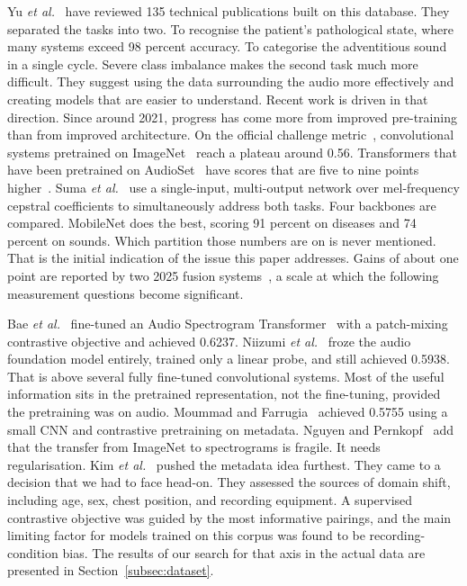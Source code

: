 \documentclass[journal,onecolumn]{IEEEtran}
\begin{document}
Yu \emph{et al.}~\cite{electronics2025review} have reviewed 135 technical publications
built on this database. They separated the tasks into two. To recognise the patient's
pathological state, where many systems exceed 98 percent accuracy. To categorise the
adventitious sound in a single cycle. Severe class imbalance makes the second task much
more difficult. They suggest using the data surrounding the audio more effectively and
creating models that are easier to understand. Recent work is driven in that direction.
Since around 2021, progress has come more from improved pre-training than from improved
architecture. On the official challenge metric~\cite{respirenet2021}, convolutional
systems pretrained on ImageNet~\cite{deng2009imagenet} reach a plateau around 0.56.
Transformers that have been pretrained on AudioSet~\cite{gemmeke2017audioset} have
scores that are five to nine points higher~\cite{bae2023patchmix,bts2024,pafa2025}. Suma
\emph{et al.}~\cite{suma2025mtl} use a single-input, multi-output network over
mel-frequency cepstral coefficients to simultaneously address both tasks. Four
backbones are compared. MobileNet does the best, scoring 91 percent on diseases and 74
percent on sounds. Which partition those numbers are on is never mentioned. That is the
initial indication of the issue this paper addresses. Gains of about one point are
reported by two 2025 fusion systems~\cite{adffnet2025,bspc2025fusion}, a scale at which
the following measurement questions become significant.

Bae \emph{et al.}~\cite{bae2023patchmix} fine-tuned an Audio Spectrogram
Transformer~\cite{gong2021ast} with a patch-mixing contrastive objective and achieved
0.6237. Niizumi \emph{et al.}~\cite{frozenfm2025} froze the audio foundation model
entirely, trained only a linear probe, and still achieved 0.5938. That is above several
fully fine-tuned convolutional systems. Most of the useful information sits in the
pretrained representation, not the fine-tuning, provided the pretraining was on audio.
Moummad and Farrugia~\cite{scl2023} achieved 0.5755 using a small CNN and contrastive
pretraining on metadata. Nguyen and Pernkopf~\cite{nguyen2022cotuning} add that the
transfer from ImageNet to spectrograms is fragile. It needs regularisation. Kim
\emph{et al.}~\cite{kim2025metadata} pushed the metadata idea furthest. They came to a
decision that we had to face head-on. They assessed the sources of domain shift,
including age, sex, chest position, and recording equipment. A supervised contrastive
objective was guided by the most informative pairings, and the main limiting factor for
models trained on this corpus was found to be recording-condition bias. The results of
our search for that axis in the actual data are presented in
Section~\ref{subsec:dataset}.
\end{document}
